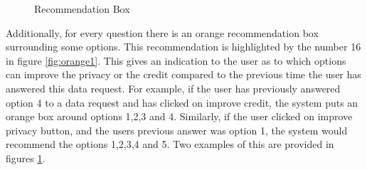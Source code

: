 \begin{figure}[htp]
  \hspace{1em}
  \caption{Recommendation Box}
  \label{fig:orange}
\end{figure}

Additionally, for every question there is an orange recommendation box surrounding some options. This recommendation is highlighted by the number 16 in figure \ref{fig:orange1}.
This gives an indication to the user as to which options can improve the privacy or the credit compared to the previous time the user has
answered this data request. For example, if the user has previously answered option 4 to a data request and has clicked on improve credit, the system
puts an orange box around options 1,2,3 and 4. Similarly, if the user clicked on improve privacy button, and the users previous answer was option 1, the system would recommend the options 1,2,3,4 and 5. Two examples of this are provided in figures \ref{fig:orange}. 

